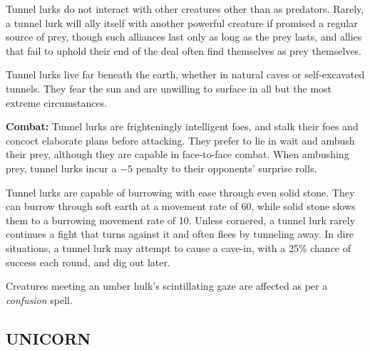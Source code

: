 \begin{multicols}{2}
Tunnel lurks do not interact with other creatures other than as predators. Rarely, a tunnel lurk will ally itself with another powerful creature if promised a regular source of prey, though such alliances last only as long as the prey lasts, and allies that fail to uphold their end of the deal often find themselves as prey themselves.

Tunnel lurks live far beneath the earth, whether in natural caves or self-excavated tunnels. They fear the sun and are unwilling to surface in all but the most extreme circumstances.

\textbf{Combat:} Tunnel lurks are frighteningly intelligent foes, and stalk their foes and concoct elaborate plans before attacking. They prefer to lie in wait and ambush their prey, although they are capable in face-to-face combat. When ambushing prey, tunnel lurks incur a $-5$ penalty to their opponents' surprise rolls.

Tunnel lurks are capable of burrowing with ease through even solid stone. They can burrow through soft earth at a movement rate of 60, while solid stone slows them to a burrowing movement rate of 10. Unless cornered, a tunnel lurk rarely continues a fight that turns against it and often flees by tunneling away. In dire situations, a tunnel lurk may attempt to cause a cave-in, with a 25\% chance of success each round, and dig out later.

Creatures meeting an umber hulk's scintillating gaze are affected as per a \textit{confusion} spell.

\noindent
\begin{minipage}{\columnwidth}

\vspace{1em}

\subsection{UNICORN}


\end{minipage}
\end{multicols}
